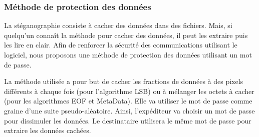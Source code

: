 \documentclass[11pt]{article}
\begin{document}
\subsubsection{Méthode de protection des données}

La stéganographie consiste à cacher des données dans des fichiers. Mais, 
si quelqu'un connaît la méthode pour cacher des données, il peut les extraire 
puis les lire en clair. 
Afin de renforcer la sécurité des communications utilisant le logiciel, 
nous proposons une méthode de protection des données utilisant un mot de passe. 

La méthode utilisée a pour but de cacher les fractions de données à des pixels 
différents à chaque fois (pour l'algorithme LSB) ou à mélanger les octets 
à cacher (pour les algorithmes EOF et MetaData). 
Elle va utiliser le mot de passe comme graine d'une suite pseudo-aléatoire. 
Ainsi, l'expéditeur va choisir un mot de passe pour dissimuler les données. 
Le destinataire utilisera le même mot de passe pour extraire les données cachées.
\end{document}
